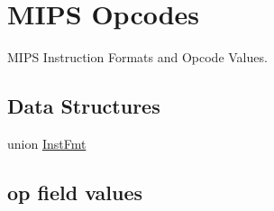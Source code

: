 \hypertarget{group__mips__ops}{}\section{M\+I\+PS Opcodes}
\label{group__mips__ops}


M\+I\+PS Instruction Formats and Opcode Values.  


\subsection*{Data Structures}
\begin{DoxyCompactItemize}
\item 
union \mbox{\hyperlink{unionInstFmt}{Inst\+Fmt}}
\end{DoxyCompactItemize}
\subsection*{\textquotesingle{}op\textquotesingle{} field values}
